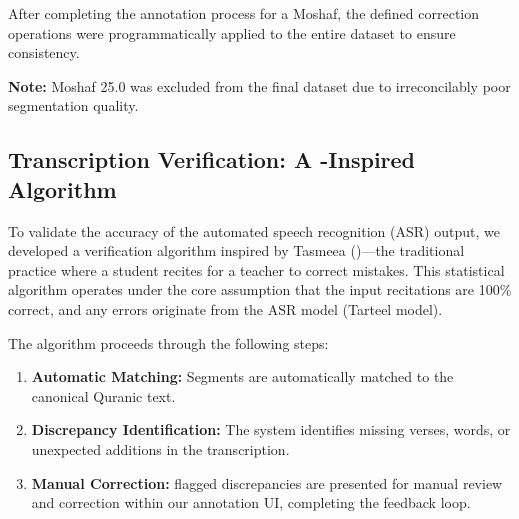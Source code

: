 After completing the annotation process for a Moshaf, the defined correction operations were programmatically applied to the entire dataset to ensure consistency.

\textbf{Note:} Moshaf 25.0 was excluded from the final dataset due to irreconcilably poor segmentation quality.

\subsection{Transcription Verification: A -Inspired Algorithm}

To validate the accuracy of the automated speech recognition (ASR) output, we developed a verification algorithm inspired by Tasmeea ()—the traditional practice where a student recites for a teacher to correct mistakes. This statistical algorithm operates under the core assumption that the input recitations are 100\% correct, and any errors originate from the ASR model (Tarteel model).

The algorithm proceeds through the following steps:
\begin{enumerate}
\item \textbf{Automatic Matching:} Segments are automatically matched to the canonical Quranic text.
\item \textbf{Discrepancy Identification:} The system identifies missing verses, words, or unexpected additions in the transcription.
\item \textbf{Manual Correction:} flagged discrepancies are presented for manual review and correction within our annotation UI, completing the  feedback loop.
\end{enumerate}
















